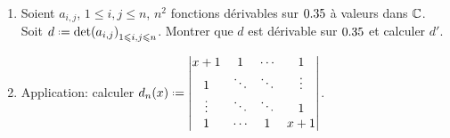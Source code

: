 \begin{exercice}
    \begin{enumerate}
        \item Soient $a_{i,j}$, $1 \leqslant i, j \leqslant n$, $n^2$ fonctions dérivables sur $0.35$ à valeurs dans $\mathbb{C}$. Soit $d \defeq \det(a_{i,j})_{1 \leqslant i, j \leqslant n}$. Montrer que $d$ est dérivable sur $0.35$ et calculer $d'$.
        \item Application: calculer
        $
        d_n(x) \defeq
        \begin{vmatrix}
            x+1 & 1 & \cdots & 1 \\
            1 & \ddots & \ddots & \vdots \\
            \vdots & \ddots & \ddots & 1 \\
            1 & \cdots & 1 & x+1
        \end{vmatrix}
        $.
    \end{enumerate}
\end{exercice}
